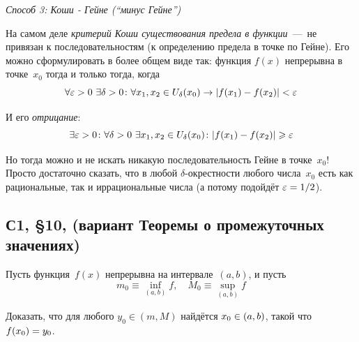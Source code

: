 \documentclass[a4paper,12pt]{article}
\begin{document}
\begin{solution}
    \medskip
    
    \emph{Способ 3: Коши - Гейне (``минус Гейне'')}

    На самом деле \emph{критерий Коши существования предела в функции}~---~не привязан к последовательностям (к определению предела в точке по Гейне).
    Его можно сформулировать в более общем виде так: функция $f(x)$ непрерывна в точке~$x_0$ тогда и только тогда, когда
    \[
      \forall \varepsilon > 0\ \exists \delta > 0\colon \forall x_1, x_2 \in U_{\delta}(x_0) \to |f(x_1) - f(x_2)| < \varepsilon
    \]

    И его \emph{отрицание}:
    \[
      \exists \varepsilon > 0\colon \forall \delta > 0\ \exists x_1, x_2 \in U_{\delta}(x_0)\colon |f(x_1) - f(x_2)| \geqslant \varepsilon
    \]

    Но тогда можно и не искать никакую последовательность Гейне в точке~$x_0$!
    Просто достаточно сказать, что в любой $\delta$-окрестности любого числа~$x_0$ есть как рациональные, так и иррациональные числа (а потому подойдёт $\eps \hm= 1 \hm/ 2$).
  \end{solution}


  \subsection{С1, \S 10,  (вариант Теоремы о промежуточных значениях)}  %

  Пусть функция~$f(x)$ непрерывна на интервале~$(a, b)$, и пусть
  \[
    m_0 \equiv \inf_{(a, b)} f,\quad M_0 \equiv \sup_{(a, b)} f
  \]

  Доказать, что для любого $y_0 \in (m, M)$ найдётся $x_0 \hm\in (a, b)$, такой что $f(x_0) \hm= y_0$.
  
\end{document}
